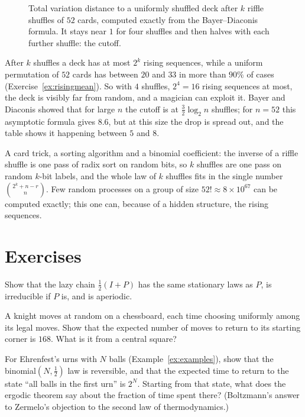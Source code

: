 \begin{figure}[ht]
\centering
{}
\caption{Total variation distance to a uniformly shuffled deck after $k$ riffle shuffles of $52$ cards, computed exactly from the
Bayer--Diaconis formula. It stays near $1$ for four shuffles and then halves with each further shuffle: the cutoff.}
\label{fig:riffle}
\end{figure}

After $k$ shuffles a deck has at most $2^k$ rising sequences, while a uniform permutation of $52$ cards has between
$20$ and $33$ in more than $90\%$ of cases (Exercise~\ref{ex:risingmean}). So with $4$ shuffles, $2^4=16$ rising sequences at most, the deck is visibly far from random,
and a magician can exploit it. Bayer and Diaconis showed that for large $n$ the cutoff is at $\frac32\log_2n$ shuffles; for $n=52$ this
asymptotic formula gives $8.6$, but at this size the drop is spread out, and the table shows it happening between $5$ and $8$.

\begin{beauty}
A card trick, a sorting algorithm and a binomial coefficient: the inverse of a riffle shuffle is one pass of radix sort
on random bits, so $k$ shuffles are one pass on random $k$-bit labels, and the whole law of $k$ shuffles fits in the single
number $\binom{2^k+n-r}n$. Few random processes on a group of size $52!\approx8\times10^{67}$ can be computed exactly; this one can, because of
a hidden structure, the rising sequences.
\end{beauty}

\section{Exercises}

\begin{exercise}[$\star$]\label{ex:lazy}
Show that the lazy chain $\frac12(I+P)$ has the same stationary laws as $P$, is irreducible if $P$ is, and is aperiodic.
\end{exercise}

\begin{exercise}[$\star$]\label{ex:knight}
A knight moves at random on a chessboard, each time choosing uniformly among its legal moves. Show that the expected
number of moves to return to its starting corner is $168$. What is it from a central square?
\end{exercise}

\begin{exercise}[$\star\star$]\label{ex:ehrenfest}
For Ehrenfest's urns with $N$ balls (Example~\ref{ex:examples}), show that the binomial$(N,\frac12)$ law is reversible, and that the expected time
to return to the state ``all balls in the first urn'' is $2^N$. Starting from that state, what does the ergodic theorem say about
the fraction of time spent there? (Boltzmann's answer to Zermelo's objection to the second law of thermodynamics.)
\end{exercise}

